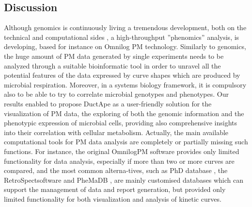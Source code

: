 \subsection{Discussion}
Although genomics is continuously living a tremendous development, both on the technical and computational sides \cite{metzker2009sequencing}, a high-throughput ”phenomics” analysis, is developing, based for instance on Omnilog PM technology. Similarly to genomics, the huge amount of PM data generated by single experiments needs to be analyzed through a suitable bioinformatic tool in order to unravel all the potential features of the data expressed by curve shapes which are produced by microbial respiration. Moreover, in a systems biology framework, it is compulsory also to be able to try to correlate microbial genotypes and phenotypes. Our results enabled to propose DuctApe as a user-friendly solution for the visualization of PM data, the exploring of both the genomic information and the phenotypic expression of microbial cells, providing also comprehensive insights into their correlation with cellular metabolism. Actually, the main available computational tools for PM data analysis are completely or partially missing such functions. For instance, the original Omnilog\texttrademark PM software provides only limited functionality for data analysis, especially if more than two or more curves are compared, and the most common alterna-tives, such as PhD database \cite{li2005phd}, the RetroSpect\texttrademark software \cite{biolog2008} and PheMaDB \cite{wenling12phemadb}, are mainly customised databases which can support the management of data and report generation, but provided only limited functionality for both visualization and analysis of kinetic curves. 
